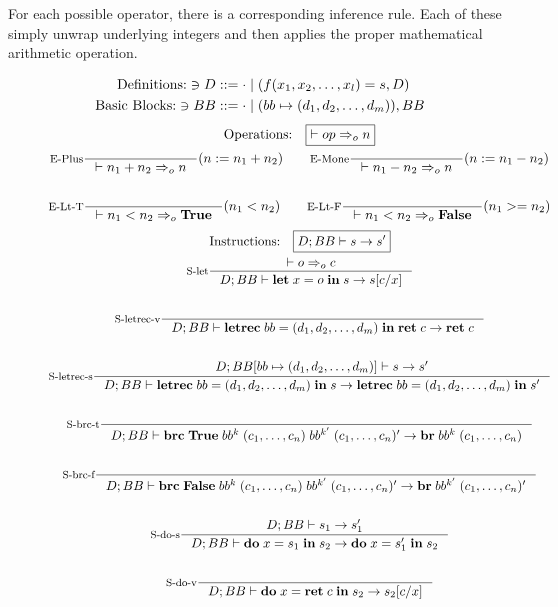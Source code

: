 \documentclass[a4paper, oneside, 10pt, draft]{memoir}
\begin{document}
For each possible operator, there is a corresponding inference
rule. Each of these simply unwrap underlying integers and then applies
the proper mathematical arithmetic operation.
\newcommand{\meval}{:=}
\begin{figure}
  \begin{align*}
    \text{Definitions:} \ni D & ::= \cdot \; \vert \; (f(x_1, x_2, \dotsc,
    x_l) = s, D)\\
    \text{Basic Blocks:} \ni BB & ::= \cdot \; \vert \; (bb \mapsto (d_1, d_2, \dotsc, d_m)),BB
  \end{align*}
  \begin{gather*}
    \text{Operations:} \quad \boxed{|- op \eop n}\\
    \inference[E-Plus]{}{|- n_1 + n_2 \eop n}(n \meval n_1 + n_2)
    \quad \quad
    \inference[E-Mone]{}{|- n_1 - n_2 \eop n}(n \meval n_1 - n_2)\\\\
    \inference[E-Lt-T]{}{|- n_1  < n_2 \eop \btrue}(n_1 < n_2) \quad \quad
    \inference[E-Lt-F]{}{|- n_1  < n_2 \eop \bfalse}(n_1 >= n_2)
  \end{gather*}
  \begin{gather*}
    \text{Instructions:} \quad \boxed{D;BB |- s -> s'}\\
    \inference[S-let]{|- o \eop c}{D;BB |- \ilet{x}{o}{s} -> s[c/x]}\\\\
    \inference[S-letrec-v]{}{D;BB |- \iletrec{bb}{\dbundle}
      {\iret{c}} -> \iret{c}}\\\\
    \inference[S-letrec-s]{D;BB[bb \mapsto \dbundle] |- s -> s'}
    {D;BB |- \iletrec{bb}{\dbundle}{s} -> \iletrec{bb}{\dbundle}{s'}}\\\\
    \inference[S-brc-t]{}{D;BB |-
      \ibrc{\btrue}{bb^k}{(c_1, \dotsc, c_n)}{bb^{k'}}{(c_1, \dotsc, c_n)'} -> \ibr{bb^k}{(c_1, \dotsc, c_n)}}\\\\
    \inference[S-brc-f]{}{D;BB |-
      \ibrc{\bfalse}{bb^k}{(c_1, \dotsc, c_n)}{bb^{k'}}{(c_1, \dotsc, c_n)'} ->
      \ibr{bb^{k'}}{(c_1, \dotsc, c_n)'}}\\\\
    \inference[S-do-s]{D;BB |- s_1 -> s'_1}{D;BB |-
      \ido{x}{s_1}{s_2} -> \ido{x}{s'_1}{s_2}}\\\\
    \inference[S-do-v]{}{D;BB |- \ido{x}{\iret{c}}{s_2} -> s_2[c/x]}\\\\

\end{gather*}
\end{figure}
\end{document}
